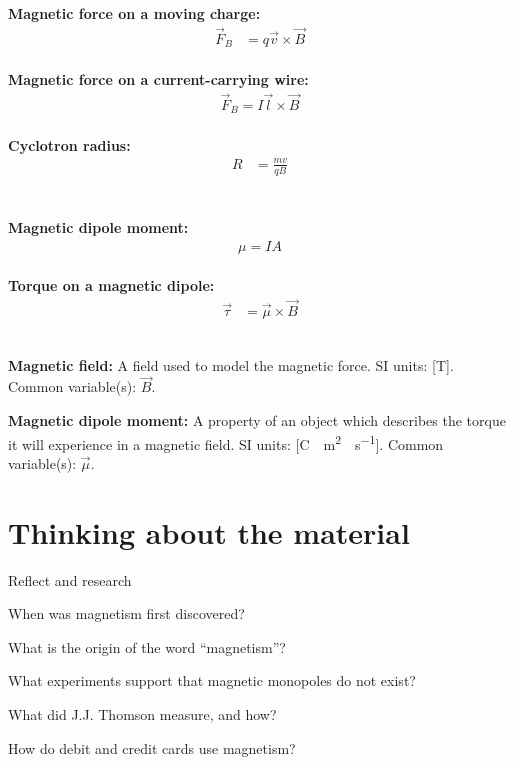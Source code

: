 \newpage
\begin{importantEquations}
\begin{multicols}{2}
\textbf{Magnetic force on a moving charge:}
\begin{align*}
\vec F_B &= q\vec v\times \vec B
\end{align*}
\\
\textbf{Magnetic force on a current-carrying wire:}
\begin{align*}
\vec F_B = I \vec l \times \vec B
\end{align*}
\\
\textbf{Cyclotron radius:}
\begin{align*}
R &= \frac{mv}{qB}
\end{align*}
\\
\columnbreak
\\
\textbf{Magnetic dipole moment:}
\begin{align*}
\mu = IA
\end{align*}
\\
\textbf{Torque on a magnetic dipole:}
\begin{align*}
\vec \tau &= \vec \mu \times \vec B
\end{align*}
\\
\end{multicols}
\end{importantEquations}

\begin{definitions}
	\item \textbf{Magnetic field:} A field used to model the magnetic force. SI units: [\si{T}]. Common variable(s): $\vec B$.
	\item \textbf{Magnetic dipole moment:} A property of an object which describes the torque it will experience in a magnetic field. SI units: [\si{C\cdot m^2\cdot s^{-1}}]. Common variable(s): $\vec \mu$.
\end{definitions}

\newpage
\section{Thinking about the material}

\begin{chapteractivity}{Reflect and research}
{
\item When was magnetism first discovered?
\item What is the origin of the word ``magnetism''?
\item What experiments support that magnetic monopoles do not exist?
\item What did J.J. Thomson measure, and how?
\item How do debit and credit cards use magnetism?
}
\end{chapteractivity}

